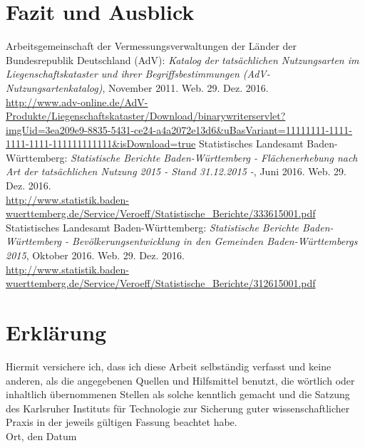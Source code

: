 \documentclass[12pt,a4paper]{scrartcl}
\begin{document}
\section{Fazit und Ausblick}

\newpage
\begin{thebibliography}{50}
 Arbeitsgemeinschaft der Vermessungsverwaltungen der Länder der Bundesrepublik Deutschland (AdV): \textit{Katalog der tatsächlichen Nutzungsarten im Liegenschaftskataster und ihrer Begriffsbestimmungen (AdV-Nutzungsartenkatalog)}, November 2011. Web. 29. Dez. 2016.\\ \url{http://www.adv-online.de/AdV-Produkte/Liegenschaftskataster/Download/binarywriterservlet?imgUid=3ea209e9-8835-5431-ce24-a4a2072e13d6&uBasVariant=11111111-1111-1111-1111-111111111111&isDownload=true}
 Statistisches Landesamt Baden-Württemberg: \textit{Statistische Berichte Baden-Württemberg - Flächenerhebung nach Art der tatsächlichen Nutzung 2015 - Stand 31.12.2015 -}, Juni 2016. Web. 29. Dez. 2016. \\ \url{http://www.statistik.baden-wuerttemberg.de/Service/Veroeff/Statistische_Berichte/333615001.pdf} 
 Statistisches Landesamt Baden-Württemberg: \textit{Statistische Berichte Baden-Württemberg - Bevölkerungsentwicklung in den Gemeinden Baden-Württembergs 2015}, Oktober 2016. Web. 29. Dez. 2016. \\ \url{http://www.statistik.baden-wuerttemberg.de/Service/Veroeff/Statistische_Berichte/312615001.pdf} 

	


 
\end{thebibliography}
 
      

\newpage
  
 \thispagestyle{empty}


\vspace*{8cm}


\section*{Erklärung}

Hiermit versichere ich, dass ich diese Arbeit selbständig verfasst und keine anderen, als die angegebenen Quellen und Hilfsmittel benutzt, die wörtlich oder inhaltlich übernommenen Stellen als solche kenntlich gemacht und die Satzung des Karlsruher Instituts für Technologie zur Sicherung guter wissenschaftlicher Praxis in der jeweils gültigen Fassung beachtet habe. \\[2ex] 

\noindent
Ort, den Datum\\[5ex]

\end{document}
